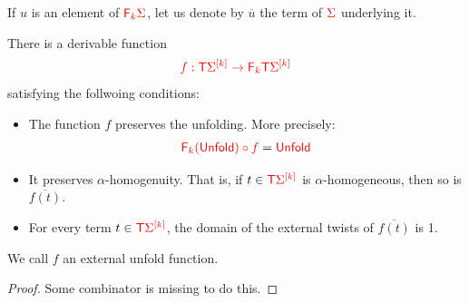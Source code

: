 If $u$ is an element of ${\color{red}{{\color{red}{\mathsf F_{k}}}\Sigma}}$, let us denote by $\overline{u}$ the term of ${\color{red}{\Sigma}}$ underlying it.
\begin{lemma}\label{lem:unfold-external-twist}
There is a derivable function
\begin{align*}
{\color{red}{f:{\color{red}{\mathsf T}}\Sigma^{{\color{red}{[k]}}} \to {\color{red}{\mathsf F_{k}}}{\color{red}{\mathsf T}}\Sigma^{{\color{red}{[k]}}}}}
\end{align*}
satisfying the follwoing conditions:
\begin{itemize}
\item The function $f$ preserves the unfolding. More precisely:
\begin{align*}
{\color{red}{{\color{red}{\mathsf F_{k}}}(\mathsf{Unfold})\circ f}}={\color{red}{\mathsf{Unfold}}}
\end{align*} 
\item It preserves $\alpha$-homogenuity. That is, if $t\in{\color{red}{{\color{red}{\mathsf T}}{\color{red}{\Sigma}}^{{\color{red}{[k]}}}}}$ is $\alpha$-homogeneous, then so is $\overline{f(t)}$.
\item  For every term $t\in {\color{red}{{\color{red}{\mathsf T}}{\color{red}{\Sigma}}^{{\color{red}{[k]}}}}}$, the domain of the external twists of $\overline{f(t)}$ is 1.
\end{itemize}
We call $f$ an external unfold function.
\end{lemma}
\begin{proof}
Some combinator is missing to do this.
\end{proof}
